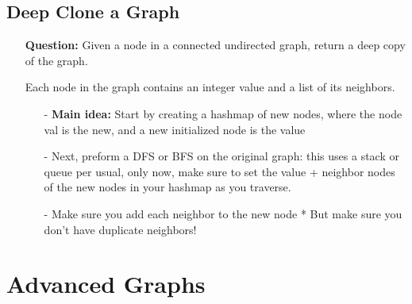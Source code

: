 \documentclass[12pt]{article}
\begin{document}
\subsection{Deep Clone a Graph}
\begin{enumerate}
  \item[] \textbf{Question:} Given a node in a connected undirected graph, return a deep copy of the graph.

Each node in the graph contains an integer value and a list of its neighbors.

    \begin{enumerate}
      \item[-] \textbf{Main idea:} Start by creating a hashmap of new nodes, where the node val is the new, and a new initialized node is the value
      \item[-] Next, preform a DFS or BFS on the original graph: this uses a stack or queue per usual, only now, make sure to set the value + neighbor nodes of the new nodes in your hashmap as you traverse. 
      \item[-] Make sure you add each neighbor to the new node * But make sure you don't have duplicate neighbors!
    \end{enumerate}
\end{enumerate}



\section{Advanced Graphs}
\end{document}
